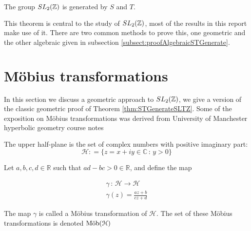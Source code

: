 \begin{theorem}\label{thm:STGenerateSLTZ}
The group $SL_2(\mathbb{Z})$ is generated by $S$ and $T$. 
\end{theorem}
This theorem is central to the study of $SL_2(\mathbb{Z})$, most of the results in this report make use of it. There are two common methods to prove this, one geometric and the other algebraic given in subsection \ref{subsect:proofAlgebraicSTGenerate}.

\section{Möbius transformations}

In this section we discuss a geometric approach to $SL_2(\mathbb{Z})$, we give a version of the classic geometric proof of Theorem \ref{thm:STGenerateSLTZ}. Some of the exposition on Möbius transformations was derived from University of Manchester hyperbolic geometry course notes \citep{manchesterNotes}
\\

\begin{definition}
The upper half-plane is the set of complex numbers with positive imaginary part:
$$ \mathcal{H} : = \{ z  = x + iy \in \mathbb{C} \, : \, y > 0\}$$ 
\end{definition}

\begin{definition}

Let $a,b,c,d \in \mathbb{R}$ such that $ad -bc >0 \in \mathbb{R}$, and define the map

\begin{align*}
\gamma \, : \, \mathcal{H} \rightarrow \mathcal{H} \\
\gamma(z) = \frac{az + b}{cz +d}
\end{align*}

The map $\gamma$ is called a Möbius transformation of $\mathcal{H}$. The set of these Möbius transformations is denoted $\text{M{\"o}b}(\mathcal{H})$
\end{definition}

